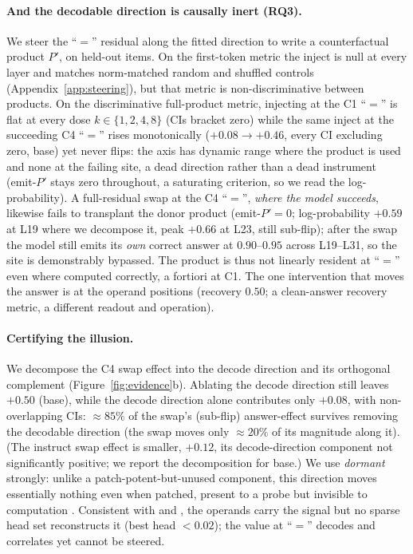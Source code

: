 \paragraph{And the decodable direction is causally inert (RQ3).}
We steer the ``$=$'' residual along the fitted direction to write a counterfactual product $P'$,
on held-out items. On the first-token metric the inject is null at every layer and matches
norm-matched random and shuffled controls (Appendix~\ref{app:steering}), but that metric is
non-discriminative between products. On the discriminative full-product metric, injecting at the
C1 ``$=$'' is flat at every dose $k \in \{1,2,4,8\}$ (CIs bracket zero) while the same inject at
the succeeding C4 ``$=$'' rises monotonically ($+0.08 \to +0.46$, every CI excluding zero, base)
yet never flips: the axis has dynamic range where the product is used and none at the failing
site, a dead direction rather than a dead instrument (emit-$P'$ stays zero throughout, a
saturating criterion, so we read the log-probability). A full-residual swap at the C4 ``$=$'',
\emph{where the model succeeds}, likewise fails to transplant the donor product (emit-$P' = 0$;
log-probability $+0.59$ at L19 where we decompose it, peak $+0.66$ at L23, still sub-flip); after
the swap the model still emits its \emph{own} correct answer at $0.90$--$0.95$ across L19--L31, so
the site is demonstrably bypassed. The product is thus not linearly resident at ``$=$'' even where
computed correctly, a fortiori at C1.
The one intervention that moves the answer is at the operand positions (recovery $0.50$; a
clean-answer recovery metric, a different readout and operation).

\paragraph{Certifying the illusion.}
We decompose the C4 swap effect into the decode direction and its orthogonal complement
(Figure~\ref{fig:evidence}b). Ablating the decode direction still leaves $+0.50$ (base), while
the decode direction alone contributes only $+0.08$, with non-overlapping CIs: $\approx 85\%$ of
the swap's (sub-flip) answer-effect survives removing the decodable direction (the swap moves only
$\approx 20\%$ of its magnitude along it). (The instruct swap effect is smaller, $+0.12$, its
decode-direction component not significantly positive; we report the decomposition for base.) We
use \emph{dormant} strongly: unlike a patch-potent-but-unused component, this direction moves
essentially nothing even when patched, present to a probe but invisible to computation
\citep{makelov-etal-2024-subspace}. Consistent with \citet{stolfo-etal-2023-mechanistic}
and \citet{nikankin-etal-2025-arithmetic}, the operands carry the signal but no sparse head set
reconstructs it (best head $< 0.02$); the value at ``$=$'' decodes and correlates yet cannot be
steered.

